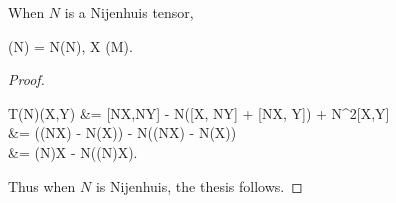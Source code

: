 \documentclass[main.tex]{subfiles}
\begin{document}



\begin{lemma}
	When $N$ is a Nijenhuis tensor,
	\begin{eqalign}
	\label{eq:nijenhuis_prop}
		(N) = N(N), \quad \forall X \in \fields(M).
	\end{eqalign}
\end{lemma}
\begin{proof}
	\begin{eqalign}
		T(N)(X,Y) &= [NX,NY] - N([X, NY] + [NX, Y]) + N^2[X,Y]\\
		&= ((NX) - N(X)) - N((NX) - N(X))\\
		&= (N)X - N((N)X).
	\end{eqalign}
	Thus when $N$ is Nijenhuis, the thesis follows.
\end{proof}
\end{document}
